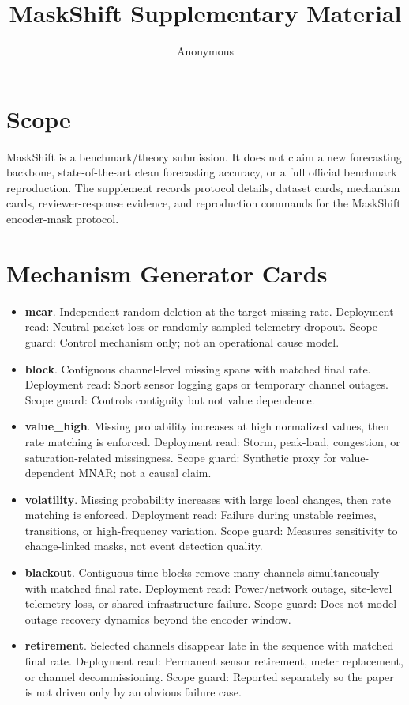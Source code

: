 \documentclass[10pt]{article}
\title{MaskShift Supplementary Material}
\author{Anonymous}
\date{}
\begin{document}
\maketitle

\section{Scope}
MaskShift is a benchmark/theory submission. It does not claim a new forecasting backbone, state-of-the-art clean forecasting accuracy, or a full official benchmark reproduction. The supplement records protocol details, dataset cards, mechanism cards, reviewer-response evidence, and reproduction commands for the MaskShift encoder-mask protocol.

\section{Mechanism Generator Cards}
\begin{itemize}
\item \textbf{mcar}. Independent random deletion at the target missing rate. Deployment read: Neutral packet loss or randomly sampled telemetry dropout. Scope guard: Control mechanism only; not an operational cause model.
\item \textbf{block}. Contiguous channel-level missing spans with matched final rate. Deployment read: Short sensor logging gaps or temporary channel outages. Scope guard: Controls contiguity but not value dependence.
\item \textbf{value\_high}. Missing probability increases at high normalized values, then rate matching is enforced. Deployment read: Storm, peak-load, congestion, or saturation-related missingness. Scope guard: Synthetic proxy for value-dependent MNAR; not a causal claim.
\item \textbf{volatility}. Missing probability increases with large local changes, then rate matching is enforced. Deployment read: Failure during unstable regimes, transitions, or high-frequency variation. Scope guard: Measures sensitivity to change-linked masks, not event detection quality.
\item \textbf{blackout}. Contiguous time blocks remove many channels simultaneously with matched final rate. Deployment read: Power/network outage, site-level telemetry loss, or shared infrastructure failure. Scope guard: Does not model outage recovery dynamics beyond the encoder window.
\item \textbf{retirement}. Selected channels disappear late in the sequence with matched final rate. Deployment read: Permanent sensor retirement, meter replacement, or channel decommissioning. Scope guard: Reported separately so the paper is not driven only by an obvious failure case.
\end{itemize}
\end{document}
